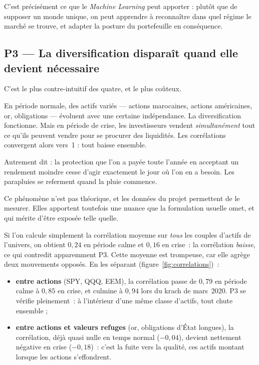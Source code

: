C'est précisément ce que le \emph{Machine Learning} peut apporter : plutôt que de
supposer un monde unique, on peut apprendre à reconnaître dans quel régime le
marché se trouve, et adapter la posture du portefeuille en conséquence.

\subsection{P3 — La diversification disparaît quand elle devient nécessaire}

C'est le plus contre-intuitif des quatre, et le plus coûteux.

En période normale, des actifs variés — actions marocaines, actions américaines,
or, obligations — évoluent avec une certaine indépendance. La diversification
fonctionne. Mais en période de crise, les investisseurs vendent
\emph{simultanément} tout ce qu'ils peuvent vendre pour se procurer des liquidités.
Les corrélations convergent alors vers~1 : tout baisse ensemble.

\begin{remarquebox}
Autrement dit : la protection que l'on a payée toute l'année en acceptant un
rendement moindre cesse d'agir exactement le jour où l'on en a besoin. Les
parapluies se referment quand la pluie commence.
\end{remarquebox}

Ce phénomène n'est pas théorique, et les données du projet permettent de le
mesurer. Elles apportent toutefois une nuance que la formulation usuelle omet, et
qui mérite d'être exposée telle quelle.

Si l'on calcule simplement la corrélation moyenne sur \emph{tous} les couples
d'actifs de l'univers, on obtient $0{,}24$ en période calme et $0{,}16$ en
crise~: la corrélation \emph{baisse}, ce qui contredit apparemment P3. Cette
moyenne est trompeuse, car elle agrège deux mouvements opposés. En les séparant
(figure~\ref{fig:correlations})~:

\begin{itemize}
  \item \textbf{entre actions} (SPY, QQQ, EEM), la corrélation passe de $0{,}79$
        en période calme à $0{,}85$ en crise, et culmine à $0{,}94$ lors du krach
        de mars~2020. P3 se vérifie pleinement~: à l'intérieur d'une même classe
        d'actifs, tout chute ensemble ;
  \item \textbf{entre actions et valeurs refuges} (or, obligations d'État
        longues), la corrélation, déjà quasi nulle en temps normal ($-0{,}04$),
        devient nettement négative en crise ($-0{,}18$)~: c'est la fuite vers la
        qualité, ces actifs montant lorsque les actions s'effondrent.
\end{itemize}

